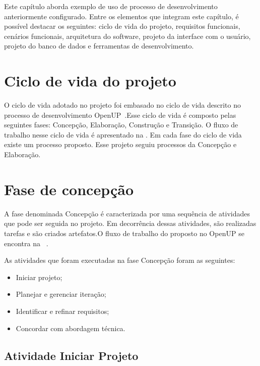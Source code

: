 Este capítulo aborda exemplo de uso de processo de desenvolvimento anteriormente configurado. Entre os elementos que integram este capítulo, é possível destacar os seguintes: ciclo de vida do projeto, requisitos funcionais, cenários funcionais, arquitetura do software, projeto da interface com o usuário, projeto do banco de dados e ferramentas de desenvolvimento.


\section{Ciclo de vida do projeto}
O ciclo de vida adotado no projeto foi embasado no ciclo de vida descrito no processo de desenvolvimento  OpenUP~\cite{openup}.Esse ciclo de vida é composto pelas seguintes fases: Concepção, Elaboração, Construção e Transição. O fluxo de trabalho nesse ciclo de vida é apresentado na . Em cada fase do ciclo de vida existe um processo proposto. Esse projeto seguiu processos da Concepção e  Elaboração.

%

\section{Fase de concepção}

A fase denominada Concepção é caracterizada por uma sequência de atividades que pode ser seguida no projeto. Em decorrência dessas atividades, são realizadas tarefas e são criados artefatos.O fluxo de trabalho do proposto no OpenUP se encontra na ~.

%

As atividades que foram executadas na fase Concepção foram as seguintes:
\begin{itemize}
    \item Iniciar projeto;
    \item Planejar e gerenciar iteração;
    \item Identificar e refinar requisitos;
    \item Concordar com abordagem técnica.
\end{itemize}

\subsection{Atividade Iniciar Projeto}

